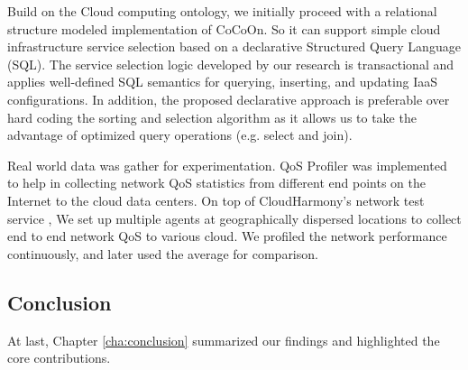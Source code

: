 Build on the Cloud computing ontology, we initially proceed with
a relational structure modeled implementation of CoCoOn.
So it can support simple cloud infrastructure service selection based on a
declarative Structured Query Language (SQL). 
The service selection logic developed by our research is
transactional and applies well-defined SQL semantics for
querying, inserting, and updating IaaS configurations. In
addition, the proposed declarative approach is preferable
over hard coding the sorting and selection algorithm as 
it allows us to take the advantage of optimized
query operations (e.g. select and join). 

Real world data was gather for experimentation.
QoS Profiler was implemented to help in collecting network QoS statistics
from different end points on the Internet to the cloud data centers.
On top of CloudHarmony's network test service \cite{cloudharmony_speedtest}, We set up multiple agents at geographically dispersed locations to collect end to end network QoS to various cloud.
We profiled the network performance continuously, and later used the average for comparison.

\subsection{Conclusion}
At last, Chapter \ref{cha:conclusion} summarized our findings and highlighted the core contributions.
